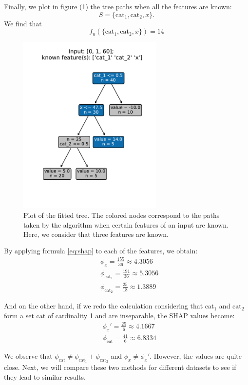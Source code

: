 \documentclass[11pt]{article}
\begin{document}
Finally, we plot in figure (\ref{fig:tree3}) the tree paths when all the features are known: 
$$S = \{\text{cat}_1, \text{cat}_2, x\}.$$
We find that 
$$f_u(\{\text{cat}_1, \text{cat}_2, x\}) = 14$$


\begin{figure}[H]
    \centering
    \includegraphics[height=9cm]{"../outputs/plot_tree/figures/path_3_known.pdf"}
    \caption{Plot of the fitted tree. The colored nodes correspond to the paths taken 
    by the algorithm when certain features of an input are known. Here, we consider that 
    three features are known.}
    \label{fig:tree3}
\end{figure}

By applying formula \ref{eq:shap} to each of the features, we obtain:
\begin{align*}
    & \phi_x = \frac{155}{36} \approx 4.3056\\
    & \phi_{\text{cat}_1} = \frac{191}{36} \approx 5.3056 \\
    & \phi_{\text{cat}_2} = \frac{25}{18} \approx 1.3889
\end{align*}

And on the other hand, if we redo the calculation considering that $\text{cat}_1$ and $\text{cat}_2$ form 
a set cat of cardinality 1 and are inseparable, the SHAP values become:
\begin{align*}
    & \phi_x' = \frac{25}{6} \approx 4.1667\\
    & \phi_{\text{cat}} = \frac{41}{6} \approx 6.8334
\end{align*}

We observe that $\phi_{\text{cat}} \neq  \phi_{\text{cat}_1}+\phi_{\text{cat}_2} $ and 
$\phi_x \neq  \phi_x'$. However, the values are quite close. Next, we will 
compare these two methods for different datasets to see if they lead to similar results.

\newpage

\end{document}
